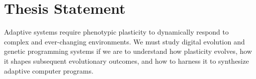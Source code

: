 \section{Thesis Statement}


Adaptive systems require phenotypic plasticity to dynamically respond to complex and ever-changing environments.
We must study digital evolution and genetic programming systems if we are to understand how plasticity evolves, how it shapes subsequent evolutionary outcomes, and how to harness it to synthesize adaptive computer programs. %




